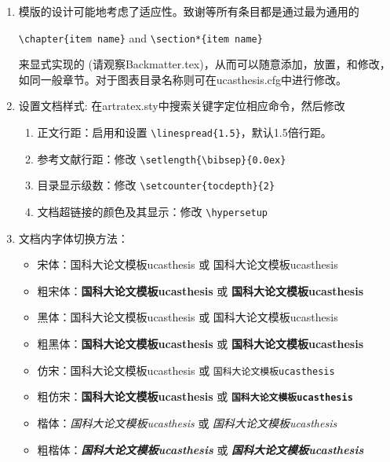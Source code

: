 \begin{enumerate}
        \item 模版的设计可能地考虑了适应性。致谢等所有条目都是通过最为通用的

        \verb+\chapter{item name}+  and \verb+\section*{item name}+

        来显式实现的 (请观察Backmatter.tex)，从而可以随意添加，放置，和修改，如同一般章节。对于图表目录名称则可在ucasthesis.cfg中进行修改。

        \item 设置文档样式: 在artratex.sty中搜索关键字定位相应命令，然后修改
        \begin{enumerate}
            \item 正文行距：启用和设置 \verb|\linespread{1.5}|，默认1.5倍行距。
            \item 参考文献行距：修改 \verb|\setlength{\bibsep}{0.0ex}|
            \item 目录显示级数：修改 \verb|\setcounter{tocdepth}{2}|
            \item 文档超链接的颜色及其显示：修改 \verb|\hypersetup|
        \end{enumerate}

        \item 文档内字体切换方法：
        \begin{itemize}
            \item 宋体：国科大论文模板ucasthesis 或 \textrm{国科大论文模板ucasthesis}
            \item 粗宋体：{\bfseries 国科大论文模板ucasthesis} 或 \textbf{国科大论文模板ucasthesis}
            \item 黑体：{\sffamily 国科大论文模板ucasthesis} 或 \textsf{国科大论文模板ucasthesis}
            \item 粗黑体：{\bfseries\sffamily 国科大论文模板ucasthesis} 或 \textsf{\bfseries 国科大论文模板ucasthesis}
            \item 仿宋：{\ttfamily 国科大论文模板ucasthesis} 或 \texttt{国科大论文模板ucasthesis}
            \item 粗仿宋：{\bfseries\ttfamily 国科大论文模板ucasthesis} 或 \texttt{\bfseries 国科大论文模板ucasthesis}
            \item 楷体：{\itshape 国科大论文模板ucasthesis} 或 \textit{国科大论文模板ucasthesis}
            \item 粗楷体：{\bfseries\itshape 国科大论文模板ucasthesis} 或 \textit{\bfseries 国科大论文模板ucasthesis}
        \end{itemize}
\end{enumerate}


